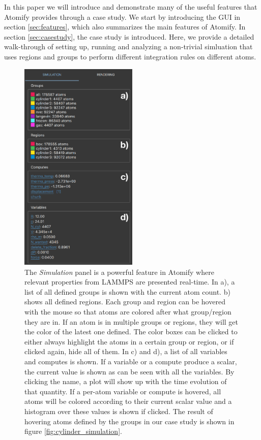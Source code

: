 \documentclass[12pt,a4paper,final]{iopart}
\begin{document}
In this paper we will 
introduce and demonstrate many of the useful features that Atomify provides through a case study. 
We start by introducing the GUI in section \ref{sec:features}, which also summarizes the main features of Atomify.
In section \ref{sec:casestudy}, the case study is introduced. Here, we provide a detailed walk-through of setting up, running and analyzing a non-trivial simluation that uses regions and groups to perform different integration rules on different atoms.

\begin{figure}[htp!]
	\centering
	\includegraphics[width=0.5\textwidth]{figures/rightbar.pdf}
	\caption{
		The \textit{Simulation} panel is a powerful feature in Atomify where relevant
		properties from LAMMPS are presented real-time.
		In a), a list of all defined groups is shown with the current atom count.
		b) shows all defined regions. Each group and region can be hovered with the mouse so that atoms
		are colored after what group/region they are in. If an atom is in multiple
		groups or regions, they will get the color of the latest one defined.
		The color boxes can be clicked to either always highlight the atoms in a certain group or region,
		or if clicked again, hide all of them.
		In c) and d), a list of all variables and computes is shown. If a variable or a compute
		produce a scalar, the current value is shown as can be seen with all the variables.
		By clicking the name, a plot will show up with the time evolution of that quantity.
		If a per-atom variable or compute is hovered, all atoms will be colored according to their
		current scalar value and a histogram over these values is shown if clicked.
		The result of hovering atoms defined by the groups in our case study is shown in figure \ref{fig:cylinder_simulation}.
	}
	\label{fig:rightbar}
\end{figure}
\end{document}
